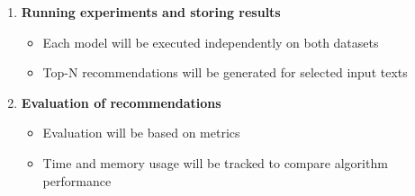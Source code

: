 \documentclass[\myFontSize,a4paper,oneside,hidelinks]{article}
\begin{document}
\begin{enumerate}
    \item \textbf{Running experiments and storing results}
    \begin{itemize}
        \item Each model will be executed independently on both datasets
        \item Top-N recommendations will be generated for selected input texts
    \end{itemize}

    \item \textbf{Evaluation of recommendations}
    \begin{itemize}
        \item Evaluation will be based on metrics
        \item Time and memory usage will be tracked to compare algorithm performance
    \end{itemize}


\end{enumerate}
%


\end{document}
